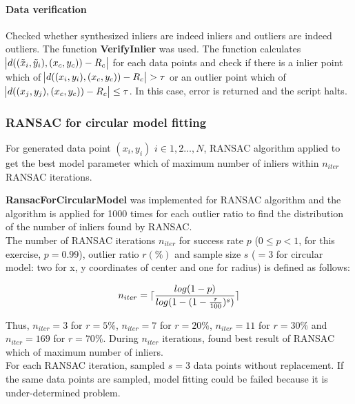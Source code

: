 \documentclass[paper=a4, fontsize=11pt]{scrartcl} %
\DeclarePairedDelimiter{\ceil}{\lceil}{\rceil}
\numberwithin{equation}{section} %
\numberwithin{figure}{section} %
\numberwithin{table}{section} %
\newcommand{\funcname}[1]{\textbf{#1}}
\begin{document}
\paragraph{Data verification}

Checked whether synthesized inliers are indeed inliers and outliers are indeed outliers. The function \funcname{VerifyInlier} was used. The function calculates $\abs{d((\tilde{x}_{i}, \tilde{y}_{i}), (x_{c}, y_{c})) - R_{c}}$ for each data points and check if there is a inlier point which of $\abs{d((x_{i}, y_{i}), (x_{c}, y_{c})) - R_{c}} > \tau$ or an outlier point which of $\abs{d((x_{j}, y_{j}), (x_{c}, y_{c})) - R_{c}} \leq \tau$. In this case, error is returned and the script halts. 

\subsubsection{RANSAC for circular model fitting}

For generated data point $(x_{i}, y_{i})$ $i \in {1,2\dots,N}$, RANSAC algorithm applied to get the best model parameter which of maximum number of inliers within $n_{iter}$ RANSAC iterations.

\funcname{RansacForCircularModel} was implemented for RANSAC algorithm and the algorithm is applied for 1000 times for each outlier ratio to find the distribution of the number of inliers found by RANSAC. 
 \\

The number of RANSAC iterations $n_{iter}$ for success rate $p$ ($0 \leq p < 1$, for this exercise, $p = 0.99$), outlier ratio $r  (\%)$ and sample size $s$ ($=3$ for circular model: two for x, y coordinates of center and one for radius) is defined as follows: 

\begin{equation*}
n_{iter} = \ceil{ \frac{log(1 - p)}{log(1 - (1 - \frac{r}{100}) ^ {s})} }
\end{equation*}

Thus, $n_{iter} = 3$ for $r = 5\%$, $n_{iter} = 7$ for $r = 20\%$, $n_{iter} = 11$ for $r = 30\%$ and $n_{iter} = 169$ for $r = 70\%$. During $n_{iter}$ iterations, found best result of RANSAC which of maximum number of inliers. \\

For each RANSAC iteration, sampled $s = 3$ data points without replacement. If the same data points are sampled, model fitting could be failed because it is under-determined problem. 
\end{document}
